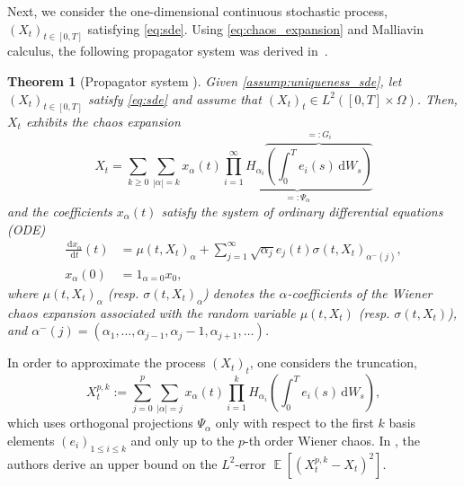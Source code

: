 \documentclass[12pt]{article}
\newtheorem{theorem}{Theorem}[section]
\theoremstyle{remark}
\theoremstyle{plain}
\numberwithin{equation}{section}
\newcommand{\dd}{\ensuremath{\,\mathrm d}}
\DeclareMathOperator{\E}{\mathbb E}
\begin{document}
Next, we consider the one-dimensional continuous stochastic process, $(X_t)_{t \in [0,T]}$ satisfying \cref{eq:sde}.
Using \cref{eq:chaos_expansion} and Malliavin calculus, the following propagator system was derived in~\cite{Huschto2014}.

\begin{theorem}[{Propagator system \cite[Theorem~2]{Huschto2014}}]\label{theorem:propagator_system}
    Given \cref{assump:uniqueness_sde}, let $(X_t)_{t \in [0,T]}$ satisfy \cref{eq:sde} and assume that $(X_t)_t \in L^2([0,T]\times \Omega)$.
    Then, $X_t$ exhibits the chaos expansion 
    \begin{equation}
        X_t = \sum_{k \geq 0}\sum_{|\alpha|=k} x_\alpha(t) \underbrace{\prod_{i=1}^\infty H_{\alpha_i}\overbrace{\left(\int_0^T e_i(s)\dd W_s\right)}^{=:G_i}}_{=:\Psi_\alpha}
        \label{eq:sde_chaos}
    \end{equation}
    and the coefficients $x_\alpha(t)$ satisfy the system of ordinary differential equations (ODE)
    \begin{align}
        \frac{\dd x_\alpha}{\dd t}(t) &= \mu(t, X_t)_\alpha + \sum_{j=1}^\infty \sqrt{\alpha_j} e_j(t)\sigma(t, X_t)_{\alpha^-(j)}, \label{eq:time_ode_coeff}\\
        x_\alpha(0) &= 1_{\alpha=0}x_0, \label{eq:ic_ode_coeff}
    \end{align}
    where $\mu(t, X_t)_\alpha$ (resp. $\sigma(t, X_t)_\alpha$) denotes the $\alpha$-coefficients of the Wiener chaos expansion associated with the random variable $\mu(t,X_t)$ (resp. $\sigma(t,X_t)$), and $\alpha^-(j)=(\alpha_1,\dots,\alpha_{j-1},\alpha_j-1,\alpha_{j+1},\dots)$.
\end{theorem}

In order to approximate the process $(X_t)_t$, one considers the truncation,
\begin{equation}
    X_t^{p,k} := \sum_{j=0}^p \sum_{|\alpha|=j} x_\alpha(t) \prod_{i=1}^k H_{\alpha_i}\left(\int_0^T e_i(s)\dd W_s\right), \label{eq:chaos_expansion_truncatation}
\end{equation}
which uses orthogonal projections $\Psi_\alpha$ only with respect to the first $k$ basis elements $(e_i)_{1 \leq i \leq k}$ and only up to the $p$-th order Wiener chaos.
In \cite{huschtoAsymptoticErrorChaos2019}, the authors derive an upper bound on the $L^2$-error $\E[(X_t^{p,k}-X_t)^2]$.
\end{document}
